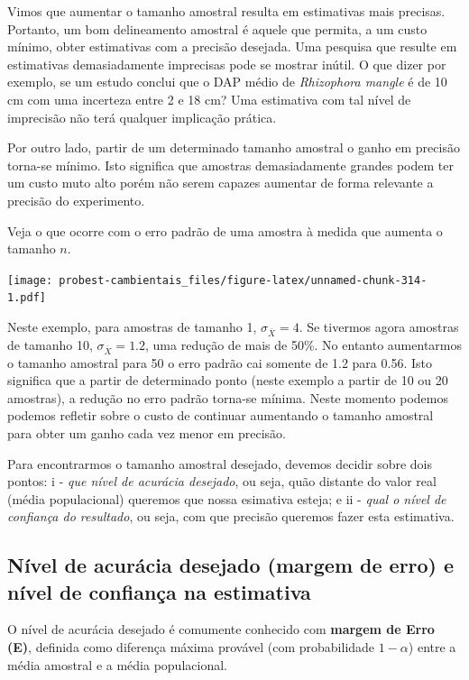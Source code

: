 \documentclass[
]{book}
\begin{document}
Vimos que aumentar o tamanho amostral resulta em estimativas mais precisas. Portanto, um bom delineamento amostral é aquele que permita, a um custo mínimo, obter estimativas com a precisão desejada. Uma pesquisa que resulte em estimativas demasiadamente imprecisas pode se mostrar inútil. O que dizer por exemplo, se um estudo conclui que o DAP médio de \emph{Rhizophora mangle} é de 10 cm com uma incerteza entre 2 e 18 cm? Uma estimativa com tal nível de imprecisão não terá qualquer implicação prática.

Por outro lado, partir de um determinado tamanho amostral o ganho em precisão torna-se mínimo. Isto significa que amostras demasiadamente grandes podem ter um custo muto alto porém não serem capazes aumentar de forma relevante a precisão do experimento.

Veja o que ocorre com o erro padrão de uma amostra à medida que aumenta o tamanho \(n\).

\texttt{[image: probest-cambientais\_files/figure-latex/unnamed-chunk-314-1.pdf]}

Neste exemplo, para amostras de tamanho 1, \(\sigma_{\overline{X}} = 4\). Se tivermos agora amostras de tamanho 10, \(\sigma_{\overline{X}} = 1.2\), uma redução de mais de 50\%. No entanto aumentarmos o tamanho amostral para 50 o erro padrão cai somente de 1.2 para 0.56. Isto significa que a partir de determinado ponto (neste exemplo a partir de 10 ou 20 amostras), a redução no erro padrão torna-se mínima. Neste momento podemos podemos refletir sobre o custo de continuar aumentando o tamanho amostral para obter um ganho cada vez menor em precisão.

Para encontrarmos o tamanho amostral desejado, devemos decidir sobre dois pontos: i - \emph{que nível de acurácia desejado}, ou seja, quão distante do valor real (média populacional) queremos que nossa esimativa esteja; e ii - \emph{qual o nível de confiança do resultado}, ou seja, com que precisão queremos fazer esta estimativa.

\hypertarget{nuxedvel-de-acuruxe1cia-desejado-margem-de-erro-e-nuxedvel-de-confianuxe7a-na-estimativa}{%
\subsection{Nível de acurácia desejado (margem de erro) e nível de confiança na estimativa}\label{nuxedvel-de-acuruxe1cia-desejado-margem-de-erro-e-nuxedvel-de-confianuxe7a-na-estimativa}}

O nível de acurácia desejado é comumente conhecido com \textbf{margem de Erro (E)}, definida como diferença máxima provável (com probabilidade \(1-\alpha\)) entre a média amostral e a média populacional.
\end{document}
